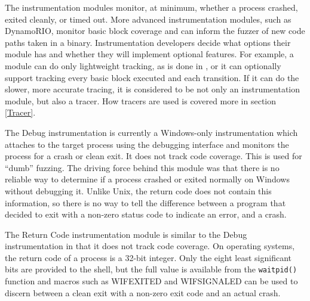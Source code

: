 The instrumentation modules monitor, at minimum, whether a process crashed,
exited cleanly, or timed out. More advanced instrumentation modules, such as
DynamoRIO, monitor basic block coverage and can inform the fuzzer of new code paths
taken in a binary.  Instrumentation developers decide what options their
module has and whether they will implement optional features. For example, a
module can do only lightweight tracking, as is done in \AFL{}, or it can
optionally support tracking every
basic block executed and each transition.  If it can do the slower, more
accurate tracing, it is considered to be not only an instrumentation module,
but also a tracer.  How tracers are used is covered more in section
\ref{Tracer}.

The Debug instrumentation is currently a Windows-only instrumentation which
attaches to the target process using the debugging interface and monitors the
process for a crash or clean exit.  It does not track code coverage.
This is used for ``dumb'' fuzzing.  The driving force behind this module was
that there is no reliable way to determine if a process crashed or exited normally
on Windows without debugging it.  Unlike Unix, the return code does not contain this information,
so there is no way to tell the difference between a program that decided to
exit with a non-zero status code to indicate an error, and a crash.

The Return Code instrumentation module is similar to the Debug instrumentation
in that it does not track code coverage. On \POSIX{} operating systems, the return
code of a process is a 32-bit integer.  Only the eight least significant bits
are provided to the shell, but the full value is available from the
\texttt{waitpid()} function and macros such as WIFEXITED and WIFSIGNALED can be used to
discern between a clean exit with a non-zero exit code and an actual crash.

